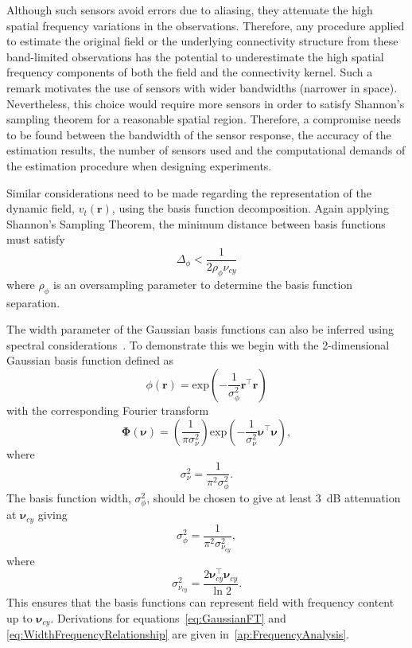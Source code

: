 \documentclass[10pt,a4paper]{article}
\begin{document}
Although such sensors avoid errors due to aliasing, they attenuate the high spatial frequency variations in the observations. Therefore, any procedure applied to estimate the original field or the underlying connectivity structure from these band-limited observations has the potential to underestimate the high spatial frequency components of both the field and the connectivity kernel. Such a remark motivates the use of sensors with wider bandwidths (narrower in space). Nevertheless, this choice would require more sensors in order to satisfy Shannon's sampling theorem for a reasonable spatial region. Therefore, a compromise needs to be found between the bandwidth of the sensor response, the accuracy of the estimation results, the number of sensors used and the computational demands of the estimation procedure when designing experiments.

Similar considerations need to be made regarding the representation of the dynamic field, $v_t(\mathbf{r})$, using the basis function decomposition. Again applying Shannon's Sampling Theorem, the minimum distance between basis functions must satisfy 
\begin{equation}\label{eq:BasisFunctionSeparation}
	\Delta_{\phi} < \frac{1}{2\rho_{\phi}\nu_{cy}}
\end{equation}
where $\rho_{\phi}$ is an oversampling parameter to determine the basis function separation. 

The width parameter of the Gaussian basis functions can also be inferred using spectral considerations~\cite{Sanner1992,Scerri2009}. To demonstrate this we begin with the 2-dimensional Gaussian basis function defined as
\begin{equation}
 \phi(\mathbf r)=\mathrm{exp}\left({-\frac{1}{\sigma_{\phi}^2} \mathbf r^\top\mathbf r}\right)
\end{equation}
with the corresponding Fourier transform
\begin{equation}\label{eq:GaussianFT}
\boldsymbol\Phi(\boldsymbol \nu)=\left(\frac{1}{\pi\sigma_{\nu}^2}\right)\mathrm{exp}\left(-\frac{1}{\sigma_{\nu}^2}\boldsymbol\nu^\top \boldsymbol\nu\right),
\end{equation}
where 
\begin{equation}\label{eq:GaussianFTWidth}
	\sigma^2_{\nu} = \frac{1}{\pi^2\sigma_{\phi}^2}. 
\end{equation}
The basis function width, $\sigma^2_{\phi}$, should be chosen to give at least 3~dB attenuation at $\boldsymbol\nu_{cy}$ giving
\begin{equation}\label{eq:WidthCutOffRelationship}
 \sigma^2_{\phi}= \frac{1}{\pi^2\sigma_{\nu_{cy}}^2},
\end{equation}
where
\begin{equation}\label{eq:WidthFrequencyRelationship}
 \sigma^2_{\nu_{cy}}= \frac{2\boldsymbol\nu_{cy}^\top \boldsymbol\nu_{cy}}{\ln 2}.
\end{equation}
This ensures that the basis functions can represent field with frequency content up to $\boldsymbol\nu_{cy}$. Derivations for equations~\ref{eq:GaussianFT} and \ref{eq:WidthFrequencyRelationship} are given in~\ref{ap:FrequencyAnalysis}.
\end{document}
